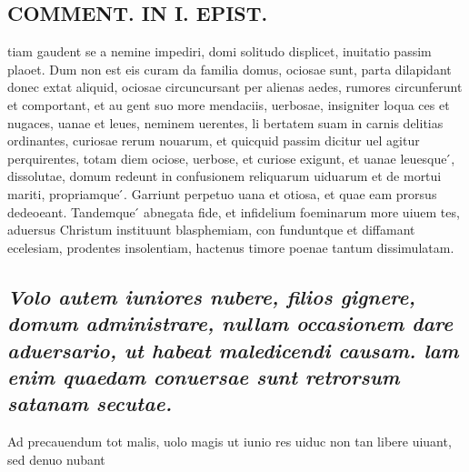\documentclass{article}
\begin{document}
\begin{pages}
\section*{COMMENT. IN I. EPIST. }
\marginpar{[ p.132 ]}\pstart tiam gaudent se a nemine impediri, domi solitudo displicet, inuitatio passim plaoet. Dum non est eis curam da familia domus, ociosae sunt, parta dilapidant donec extat aliquid, ociosae circuncursant per alienas aedes, rumores circunferunt et comportant, et au gent suo more mendaciis, uerbosae, insigniter loqua ces et nugaces, uanae et leues, neminem uerentes, li bertatem suam in carnis delitias ordinantes, curiosae rerum nouarum, et quicquid passim dicitur uel agitur perquirentes, totam diem ociose, uerbose, et curiose exigunt, et uanae leuesque ́, dissolutae, domum redeunt in confusionem reliquarum uiduarum et de mortui mariti, propriamque ́. Garriunt perpetuo uana et otiosa, et quae eam prorsus dedeoeant. Tandemque ́ abnegata fide, et infidelium foeminarum more uiuem tes, aduersus Christum instituunt blasphemiam, con funduntque et diffamant ecelesiam, prodentes insolentiam, hactenus timore poenae tantum dissimulatam.  \pend
{}
{}
\subsection*{\textit{Volo autem iuniores nubere, filios gignere, domum administrare, nullam occasionem dare aduersario, ut habeat maledicendi causam. lam enim quaedam conuersae sunt retrorsum satanam secutae. }}\pstart Ad precauendum tot malis, uolo magis ut iunio res uiduc non tan libere uiuant, sed denuo nubant  \pend

\end{pages}
\end{document}
